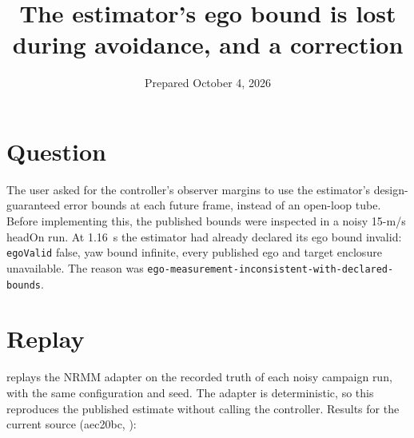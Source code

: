 \documentclass[11pt]{article}
\title{The estimator's ego bound is lost during avoidance, and a correction}
\date{Prepared October 4, 2026}
\begin{document}
\maketitle

\section{Question}
The user asked for the controller's observer margins to use the estimator's
design-guaranteed error bounds at each future frame, instead of an open-loop
tube. Before implementing this, the published bounds were inspected in a noisy
15-m/s headOn run. At 1.16~s the estimator had already declared its ego bound
invalid: \texttt{egoValid} false, yaw bound infinite, every published ego and
target enclosure unavailable. The reason was
\texttt{ego-measurement-inconsistent-with-declared-bounds}.

\section{Replay}
 replays the NRMM adapter on the
recorded truth of each noisy campaign run, with the same configuration and
seed. The adapter is deterministic, so this reproduces the published estimate
without calling the controller. Results for the current source (aec20bc,
):
\end{document}

